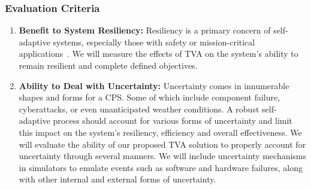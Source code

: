 \documentclass[11pt]{proposalnsf}
\newcommand{\dan}[1]{\textcolor{blue}{{\it [Dan says: #1]}}}
\newlength\q %
\begin{document}
\begin{sloppypar}


\vspace{-2mm}
\subsubsection*{Evaluation Criteria}


\begin{enumerate}[noitemsep]
    
  	\item \textbf{Benefit to System Resiliency:} Resiliency is a primary concern of self-adaptive systems, especially those with safety or mission-critical applications~\cite{de2014software}. We will measure the effects of TVA on the system's ability to remain resilient and complete defined objectives. %

	\item \textbf{Ability to Deal with Uncertainty:} Uncertainty comes in innumerable shapes and forms for a CPS. Some of which include component failure, cyberattacks, or even unanticipated weather conditions. A robust self-adaptive process should account for various forms of uncertainty and limit this impact on the system's resiliency, efficiency and overall effectiveness. We will evaluate the ability of our proposed TVA solution to properly account for uncertainty through several manners. We will include uncertainty mechanisms in simulators to emulate events such as software and hardware failures, along with other internal and external forms of uncertainty. 
    

\end{enumerate}
\end{sloppypar}
\end{document}
